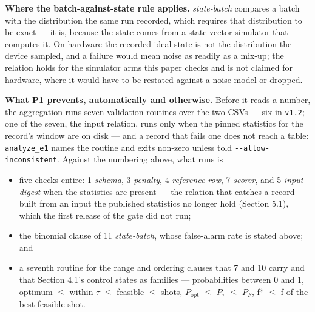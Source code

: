 \documentclass[acmsmall,screen,review]{acmart}
\begin{document}
\textbf{Where the batch-against-state rule applies.} \textit{state-batch} compares a batch with the distribution the same run recorded, which requires that distribution to be exact --- it is, because the state comes from a state-vector simulator that computes it. On hardware the recorded ideal state is not the distribution the device sampled, and a failure would mean noise as readily as a mix-up; the relation holds for the simulator arms this paper checks and is not claimed for hardware, where it would have to be restated against a noise model or dropped.


\textbf{What P1 prevents, automatically and otherwise.} Before it reads a number, the aggregation runs seven validation routines over the two CSVs --- six in \texttt{v1.2}; one of the seven, the input relation, runs only when the pinned statistics for the record's window are on disk --- and a record that fails one does not reach a table: \texttt{analyze\_e1} names the routine and exits non-zero unless told \texttt{-\allowbreak{}-\allowbreak{}allow-\allowbreak{}inconsistent}. Against the numbering above, what runs is


\begin{itemize}
\item five checks entire: 1 \textit{schema}, 3 \textit{penalty}, 4 \textit{reference-row}, 7 \textit{scorer}, and 5 \textit{input-digest} when the statistics are present --- the relation that catches a record built from an input the published statistics no longer hold (Section 5.1), which the first release of the gate did not run;
\item the binomial clause of 11 \textit{state-batch}, whose false-alarm rate is stated above; and
\item a seventh routine for the range and ordering clauses that 7 and 10 carry and that Section 4.1's control states as families --- probabilities between 0 and 1, optimum $\leq$ within-$\tau$ $\leq$ feasible $\leq$ shots, $P_{\mathrm{opt}}$ $\leq$ $P_{\tau}$ $\leq$ $P_{F}$, f* $\leq$ f of the best feasible shot.
\end{itemize}
\end{document}
